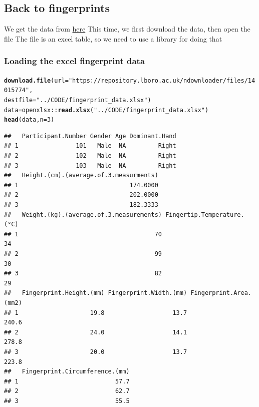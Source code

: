 \documentclass[aspectratio=169]{beamer}\usepackage[]{graphicx}\usepackage[]{xcolor}
\makeatletter
\newcommand{\hlnum}[1]{\textcolor[rgb]{0.686,0.059,0.569}{#1}}%
\newcommand{\hlstr}[1]{\textcolor[rgb]{0.192,0.494,0.8}{#1}}%
\newcommand{\hlopt}[1]{\textcolor[rgb]{0,0,0}{#1}}%
\newcommand{\hlstd}[1]{\textcolor[rgb]{0.345,0.345,0.345}{#1}}%
\newcommand{\hlkwb}[1]{\textcolor[rgb]{0.69,0.353,0.396}{#1}}%
\newcommand{\hlkwc}[1]{\textcolor[rgb]{0.333,0.667,0.333}{#1}}%
\newcommand{\hlkwd}[1]{\textcolor[rgb]{0.737,0.353,0.396}{\textbf{#1}}}%
\newenvironment{kframe}{%
 \def\at@end@of@kframe{}%
 \ifinner\ifhmode%
  \def\at@end@of@kframe{\end{minipage}}%
  \begin{minipage}{\columnwidth}%
 \fi\fi%
 \def\FrameCommand##1{\hskip\@totalleftmargin \hskip-\fboxsep
 \colorbox{shadecolor}{##1}\hskip-\fboxsep
     \hskip-\linewidth \hskip-\@totalleftmargin \hskip\columnwidth}%
 \MakeFramed {\advance\hsize-\width
   \@totalleftmargin\z@ \linewidth\hsize
   \@setminipage}}%
 {\par\unskip\endMakeFramed%
 \at@end@of@kframe}
\newenvironment{knitrout}{}{} %
\makeatother
\begin{document}
\subsection{Back to fingerprints}


\begin{frame}
We get the data from \href{https://repository.lboro.ac.uk/articles/dataset/Height_weight_and_fingerprint_measurements_collected_from_200_participants/7539206}{here}
\vfill
This time, we first download the data, then open the file
\vfill
The file is an excel table, so we need to use a library for doing that
\end{frame}


\begin{frame}[fragile]\frametitle{Loading the excel fingerprint data}
\begin{knitrout}
\color{fgcolor}\begin{kframe}
\begin{alltt}
\hlkwd{download.file}\hlstd{(}\hlkwc{url} \hlstd{=} \hlstr{"https://repository.lboro.ac.uk/ndownloader/files/14015774"}\hlstd{,}
             \hlkwc{destfile} \hlstd{=} \hlstr{"../CODE/fingerprint_data.xlsx"}\hlstd{)}
\hlstd{data} \hlkwb{=} \hlstd{openxlsx}\hlopt{::}\hlkwd{read.xlsx}\hlstd{(}\hlstr{"../CODE/fingerprint_data.xlsx"}\hlstd{)}
\hlkwd{head}\hlstd{(data,} \hlkwc{n}\hlstd{=}\hlnum{3}\hlstd{)}
\end{alltt}
\begin{verbatim}
##   Participant.Number Gender Age Dominant.Hand
## 1                101   Male  NA         Right
## 2                102   Male  NA         Right
## 3                103   Male  NA         Right
##   Height.(cm).(average.of.3.measurments)
## 1                               174.0000
## 2                               202.0000
## 3                               182.3333
##   Weight.(kg).(average.of.3.measurements) Fingertip.Temperature.(°C)
## 1                                      70                         34
## 2                                      99                         30
## 3                                      82                         29
##   Fingerprint.Height.(mm) Fingerprint.Width.(mm) Fingerprint.Area.(mm2)
## 1                    19.8                   13.7                  240.6
## 2                    24.0                   14.1                  278.8
## 3                    20.0                   13.7                  223.8
##   Fingerprint.Circumference.(mm)
## 1                           57.7
## 2                           62.7
## 3                           55.5
\end{verbatim}
\end{kframe}
\end{knitrout}
\end{frame}
\end{document}
